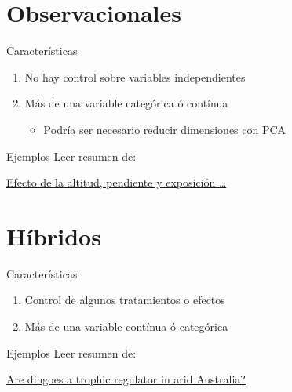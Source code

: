 \documentclass[
  11pt,
  ignorenonframetext,
]{beamer}
\providecommand{\tightlist}{%
  \setlength{\itemsep}{0pt}\setlength{\parskip}{0pt}}
\begin{document}
\hypertarget{observacionales}{%
\section{Observacionales}\label{observacionales}}

\begin{frame}{Características}
\protect\hypertarget{caracteruxedsticas-1}{}
\begin{enumerate}
\item
  No hay control sobre variables independientes
\item
  Más de una variable categórica ó contínua

  \begin{itemize}
  \tightlist
  \item
    Podría ser necesario reducir dimensiones con PCA
  \end{itemize}
\end{enumerate}
\end{frame}

\begin{frame}{Ejemplos}
\protect\hypertarget{ejemplos}{}
Leer resumen de:

\href{https://www.scielo.org.mx/scielo.php?script=sci_arttext\&pid=S0187-71512022000100111\&lang=es}{Efecto
de la altitud, pendiente y exposición \ldots{}}
\end{frame}

\hypertarget{huxedbridos}{%
\section{Híbridos}\label{huxedbridos}}

\begin{frame}{Características}
\protect\hypertarget{caracteruxedsticas-2}{}
\begin{enumerate}
\tightlist
\item
  Control de algunos tratamientos o efectos
\item
  Más de una variable contínua ó categórica
\end{enumerate}
\end{frame}

\begin{frame}{Ejemplos}
\protect\hypertarget{ejemplos-1}{}
Leer resumen de:

\href{https://onlinelibrary.wiley.com/doi/abs/10.1111/j.1442-9993.2009.02022.x?casa_token=6OoxIR1B-QoAAAAA\%3AwZbzD6pSefvllxeQeLDvjwrThwrx5kij_Y3-OiEGe-a3_fsrEbAV4nwY_qa6PKB8QJpk4om9c5cMWmcH}{Are
dingoes a trophic regulator in arid Australia?}
\end{frame}
\end{document}

